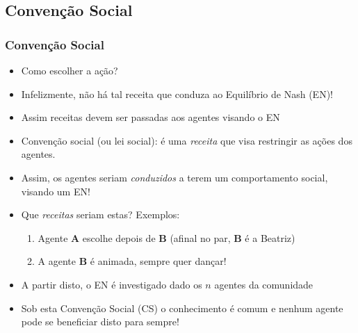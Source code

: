 \subsection{Convenção Social}

\begin{frame}[allowframebreaks=0.9]
\frametitle{Convenção Social}

\begin{itemize}
  \item Como escolher a ação?
  \item Infelizmente, não há tal receita que conduza ao Equilíbrio de Nash (EN)!
  \item Assim receitas devem ser passadas aos agentes visando o EN

\pause
  \item Convenção social (ou lei social): é uma \textit{receita} que visa
  restringir as ações  dos agentes.
  
  \item Assim, os agentes seriam \textit{conduzidos} a terem um comportamento
  social, visando um EN!
  
  \item Que \textit{receitas} seriam estas? Exemplos:
  \pause
  \begin{enumerate}
    \item Agente \textbf{A} escolhe depois de \textbf{B} (afinal no par, \textbf{B} é a Beatriz)
    \item A agente \textbf{B} é animada, sempre quer dançar!
  \end{enumerate}
  
\item A partir disto, o EN é investigado dado os $n$ agentes da comunidade


  \item Sob esta Convenção Social (CS) o conhecimento é comum e nenhum agente pode se
  beneficiar disto para sempre!
 
\end{itemize}


\end{frame}


